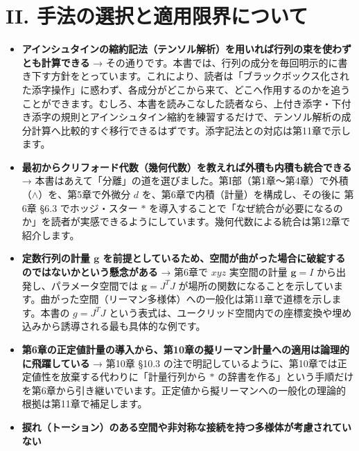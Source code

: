 \documentclass[a4paper,12pt,openany]{book}
\begin{document}
\par\vspace{0.35em}\par

\hypertarget{ii.-ux624bux6cd5ux306eux9078ux629eux3068ux9069ux7528ux9650ux754cux306bux3064ux3044ux3066}{%
\section{II.
手法の選択と適用限界について}\label{ii.-ux624bux6cd5ux306eux9078ux629eux3068ux9069ux7528ux9650ux754cux306bux3064ux3044ux3066}}

\begin{itemize}
\item
  \textbf{アインシュタインの縮約記法（テンソル解析）を用いれば行列の束を使わずとも計算できる}
  →
  その通りです。本書では、行列の成分を毎回明示的に書き下す方針をとっています。これにより、読者は「ブラックボックス化された添字操作」に惑わず、各成分がどこから来て、どこへ作用するのかを追うことができます。むしろ、本書を読みこなした読者なら、上付き添字・下付き添字の規則とアインシュタイン縮約を練習するだけで、テンソル解析の成分計算へ比較的すぐ移行できるはずです。添字記法との対応は第11章で示します。
\item
  \textbf{最初からクリフォード代数（幾何代数）を教えれば外積も内積も統合できる}
  →
  本書はあえて「分離」の道を選びました。第I部（第1章〜第4章）で外積（\(\wedge\)）を、第5章で外微分
  \(d\) を、第6章で内積（計量）を構成し、その後に 第6章 §6.3
  でホッジ・スター \(\ast\)
  を導入することで「なぜ統合が必要になるのか」を読者が実感できるようにしています。幾何代数による統合は第12章で紹介します。
\item
  \textbf{定数行列の計量 $\mathbf{g}$ を前提としているため、空間が曲がった場合に破綻するのではないかという懸念がある}
  → 第6章で \(xyz\) 実空間の計量 \(\mathbf{g}=I\)
  から出発し、パラメータ空間では \(\mathbf{g}=J^T J\)
  が場所の関数になることを示しています。曲がった空間（リーマン多様体）への一般化は第11章で道標を示します。本書の
  \(g=J^T J\)
  という表式は、ユークリッド空間内での座標変換や埋め込みから誘導される最も具体的な例です。
\item
  \textbf{第6章の正定値計量の導入から、第10章の擬リーマン計量への適用は論理的に飛躍している}
  → 第10章 §10.3
  の注で明記しているように、第10章では正定値性を放棄する代わりに「計量行列から
  \(\ast\)
  の辞書を作る」という手順だけを第6章から引き継いでいます。正定値から擬リーマンへの一般化の理論的根拠は第11章で補足します。
\item
  \textbf{捩れ（トーション）のある空間や非対称な接続を持つ多様体が考慮されていない}

\end{itemize}
\end{document}
